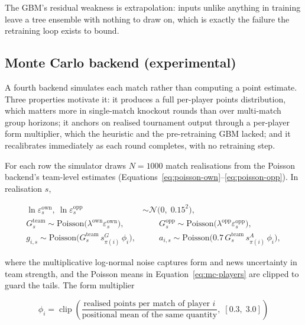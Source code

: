 The GBM's residual weakness is extrapolation: inputs unlike anything
in training leave a tree ensemble with nothing to draw on, which is
exactly the failure the retraining loop exists to bound.

\subsection{Monte Carlo backend (experimental)}
\label{sec:methodology-montecarlo}

A fourth backend simulates each match rather than computing a point
estimate. Three properties motivate it: it produces a full per-player
points distribution, which matters more in single-match knockout
rounds than over multi-match group horizons; it anchors on realised
tournament output through a per-player form multiplier, which the
heuristic and the pre-retraining GBM lacked; and it recalibrates
immediately as each round completes, with no retraining step.

For each row the simulator draws $N = 1000$ match realisations from
the Poisson backend's team-level estimates
(Equations~\ref{eq:poisson-own}--\ref{eq:poisson-opp}). In
realisation $s$,

\begin{align}
\ln \varepsilon^{\mathrm{own}}_s,\ \ln \varepsilon^{\mathrm{opp}}_s
  &\sim \mathcal{N}\bigl(0,\; 0.15^2\bigr),
\nonumber\\
G^{\mathrm{team}}_s \sim \mathrm{Poisson}\bigl(
  \lambda^{\mathrm{own}} \varepsilon^{\mathrm{own}}_s\bigr),
  &\qquad
G^{\mathrm{opp}}_s \sim \mathrm{Poisson}\bigl(
  \lambda^{\mathrm{opp}} \varepsilon^{\mathrm{opp}}_s\bigr),
\label{eq:mc-teams}\\
g_{i,s} \sim \mathrm{Poisson}\bigl(
  G^{\mathrm{team}}_s\, s^{G}_{\pi(i)}\, \phi_i\bigr),
  &\qquad
a_{i,s} \sim \mathrm{Poisson}\bigl(
  0.7\, G^{\mathrm{team}}_s\, s^{A}_{\pi(i)}\, \phi_i\bigr),
\label{eq:mc-players}
\end{align}

where the multiplicative log-normal noise captures form and news
uncertainty in team strength, and the Poisson means in
Equation~\ref{eq:mc-players} are clipped to guard the tails. The
form multiplier

\begin{equation}
\phi_i = \operatorname{clip}\!\left(
  \frac{\text{realised points per match of player } i}
       {\text{positional mean of the same quantity}},\;
  [0.3,\; 3.0]\right)
\label{eq:mc-form}
\end{equation}

